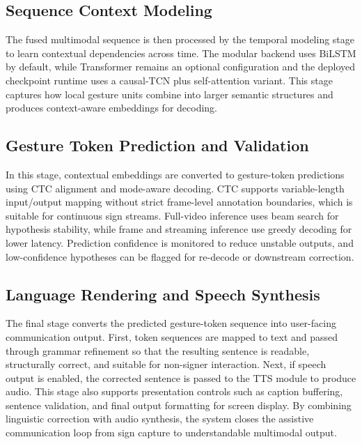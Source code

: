 \subsection{Sequence Context Modeling}
The fused multimodal sequence is then processed by the temporal modeling stage to learn contextual dependencies across time. The modular backend uses BiLSTM by default, while Transformer remains an optional configuration and the deployed checkpoint runtime uses a causal-TCN plus self-attention variant. This stage captures how local gesture units combine into larger semantic structures and produces context-aware embeddings for decoding.

\subsection{Gesture Token Prediction and Validation}
In this stage, contextual embeddings are converted to gesture-token predictions using CTC alignment and mode-aware decoding. CTC supports variable-length input/output mapping without strict frame-level annotation boundaries, which is suitable for continuous sign streams. Full-video inference uses beam search for hypothesis stability, while frame and streaming inference use greedy decoding for lower latency. Prediction confidence is monitored to reduce unstable outputs, and low-confidence hypotheses can be flagged for re-decode or downstream correction.

\subsection{Language Rendering and Speech Synthesis}
The final stage converts the predicted gesture-token sequence into user-facing communication output. First, token sequences are mapped to text and passed through grammar refinement so that the resulting sentence is readable, structurally correct, and suitable for non-signer interaction. Next, if speech output is enabled, the corrected sentence is passed to the TTS module to produce audio. This stage also supports presentation controls such as caption buffering, sentence validation, and final output formatting for screen display. By combining linguistic correction with audio synthesis, the system closes the assistive communication loop from sign capture to understandable multimodal output.
